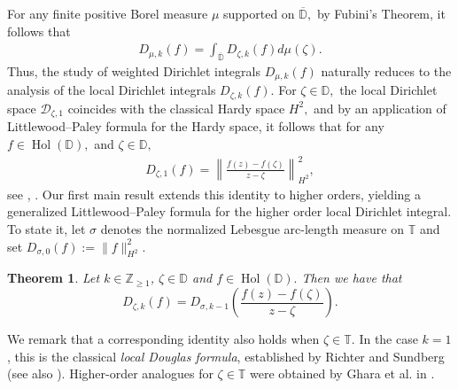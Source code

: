 \documentclass[10pt,oneside,reqno]{amsart}
\newtheorem{theorem}{Theorem}[section]
\theoremstyle{definition}
\theoremstyle{remark}
\newcommand{\D}{\mathbb D}
\newcommand{\T}{\mathbb T}
\numberwithin{equation}{section}
\begin{document}
For any finite positive Borel measure $\mu$ supported on $\overline{\D},$ by Fubini's Theorem, it follows that
\begin{align*}
     D_{\mu,k}(f)= \int_{\overline{\D}} D_{\zeta,k}(f) d\mu(\zeta).
\end{align*}
Thus, the study of weighted Dirichlet integrals $D_{\mu,k}(f)$ naturally reduces to the analysis of the local Dirichlet integrals $D_{\zeta,k}(f).$ For $\zeta\in \D,$ the local Dirichlet space $\mathscr D_{\zeta,1}$ coincides with the classical Hardy space $H^2,$ and by an application of Littlewood--Paley formula for the Hardy space, it follows that for any $f\in \operatorname{Hol} \left( \D \right),$ and $\zeta\in \D,$
\begin{align*}
  D_{\zeta,1}(f)= \left\| \frac{f(z)-f(\zeta)}{z-\zeta}\right \|_{H^2}^2,  
\end{align*}
see \cite[IV, Theorem 1.9]{1993multiplication}, \cite[VI, Lemma 3.1]{GarnettBAF}. Our first main result extends this identity to higher orders, yielding a generalized Littlewood–Paley formula for the higher order local Dirichlet integral. To state it, let $\sigma$ denotes the normalized Lebesgue arc-length measure on $\T$ and  set $D_{\sigma,0}(f):= \|f\|^2_{H^2}.$ 
\begin{theorem} \label{thm:Littlewood-Paley-Higher-Order}
    Let $k \in \mathbb Z_{\geqslant 1}$, $\zeta \in \mathbb D$ and $f\in \operatorname{Hol} \left( \D \right).$  Then we have that 
    \begin{equation*}
	       D_{\zeta, k} (f) =  D_{\sigma, k-1} \left( \frac{f(z)-f\left( \zeta \right)}{z-\zeta} \right).
    \end{equation*}
\end{theorem}

We remark that a corresponding identity also holds when $\zeta \in \mathbb{T}.$  In the case $k=1$, this is the classical \emph{local Douglas formula}, established by Richter and Sundberg \cite[Proposition 2.2]{RS1991LDI} (see also \cite[Proposition 1]{SARA1997}). Higher-order analogues for $\zeta \in \mathbb{T}$ were obtained by Ghara et al. in \cite[Theorem 1.1]{GGRLDF}. 
\end{document}
